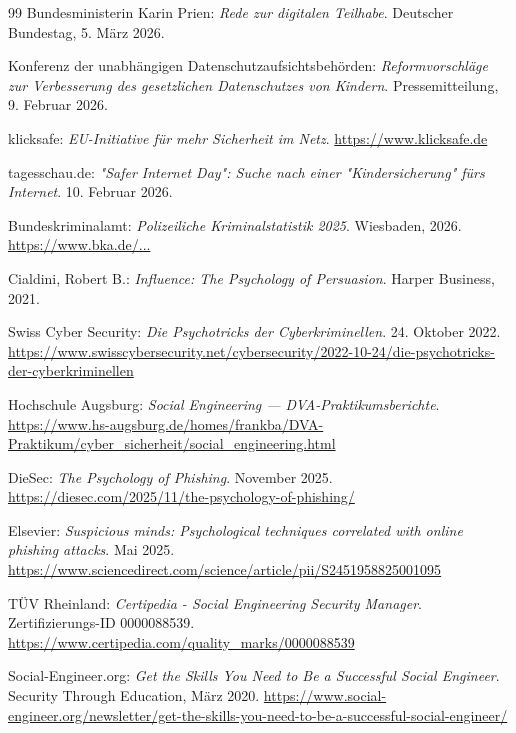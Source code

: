 \documentclass[10pt,a4paper]{article}
\begin{document}
\begin{thebibliography}{99}
		Bundesministerin Karin Prien: \textit{Rede zur digitalen Teilhabe}. Deutscher Bundestag, 5. März 2026.
		
		Konferenz der unabhängigen Datenschutzaufsichtsbehörden: \textit{Reformvorschläge zur Verbesserung des gesetzlichen Datenschutzes von Kindern}. Pressemitteilung, 9. Februar 2026.
		
		klicksafe: \textit{EU-Initiative für mehr Sicherheit im Netz}. \url{https://www.klicksafe.de}
		
		tagesschau.de: \textit{"Safer Internet Day": Suche nach einer "Kindersicherung" fürs Internet}. 10. Februar 2026.
		
		Bundeskriminalamt: \textit{Polizeiliche Kriminalstatistik 2025}. Wiesbaden, 2026. \url{https://www.bka.de/...}
		
		Cialdini, Robert B.: \textit{Influence: The Psychology of Persuasion}. Harper Business, 2021.
		
		Swiss Cyber Security: \textit{Die Psychotricks der Cyberkriminellen}. 24. Oktober 2022. \url{https://www.swisscybersecurity.net/cybersecurity/2022-10-24/die-psychotricks-der-cyberkriminellen}
		
		Hochschule Augsburg: \textit{Social Engineering — DVA-Praktikumsberichte}. \url{https://www.hs-augsburg.de/homes/frankba/DVA-Praktikum/cyber_sicherheit/social_engineering.html}
		
		DieSec: \textit{The Psychology of Phishing}. November 2025. \url{https://diesec.com/2025/11/the-psychology-of-phishing/}
		
		Elsevier: \textit{Suspicious minds: Psychological techniques correlated with online phishing attacks}. Mai 2025. \url{https://www.sciencedirect.com/science/article/pii/S2451958825001095}
		
		TÜV Rheinland: \textit{Certipedia - Social Engineering Security Manager}. Zertifizierungs-ID 0000088539. \url{https://www.certipedia.com/quality_marks/0000088539}
		
		Social-Engineer.org: \textit{Get the Skills You Need to Be a Successful Social Engineer}. Security Through Education, März 2020. \url{https://www.social-engineer.org/newsletter/get-the-skills-you-need-to-be-a-successful-social-engineer/}
		

\end{thebibliography}
\end{document}
